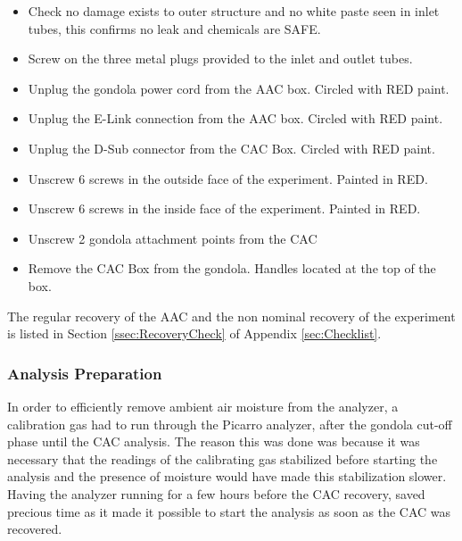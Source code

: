 \begin{itemize}
    \item Check no damage exists to outer structure and no white paste seen in inlet tubes, this confirms no leak and chemicals are SAFE.
    \item Screw on the three metal plugs provided to the inlet and outlet tubes.
    \item Unplug the gondola power cord from the AAC box. Circled with RED paint.
    \item Unplug the E-Link connection from the AAC box. Circled with RED paint.
    \item Unplug the D-Sub connector from the CAC Box. Circled with RED paint.
    \item Unscrew 6 screws in the outside face of the experiment. Painted in RED.
    \item Unscrew 6 screws in the inside face of the experiment. Painted in RED.
    \item Unscrew 2 gondola attachment points from the CAC
    \item Remove the CAC Box from the gondola. Handles located at the top of the box. 
\end{itemize}

The regular recovery of the AAC and the non nominal recovery of the experiment is listed in Section \ref{ssec:RecoveryCheck} of Appendix \ref{sec:Checklist}.



\subsubsection{Analysis Preparation}

In order to efficiently remove ambient air moisture from the analyzer, a calibration gas had to run through the Picarro analyzer, after the gondola cut-off phase until the CAC analysis. The reason this was done was because it was necessary that the readings of the calibrating gas stabilized before starting the analysis and the presence of moisture would have made this stabilization slower. Having the analyzer running for a few hours before the CAC recovery, saved precious time as it made it possible to start the analysis as soon as the CAC was recovered. 



